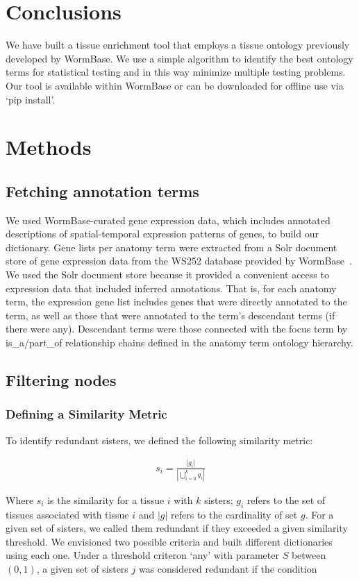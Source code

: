 \section*{Conclusions}

We have built a tissue enrichment tool that employs a tissue ontology previously
developed by WormBase. We use a simple algorithm to identify the best ontology
terms for statistical testing and in this way minimize multiple testing problems.
Our tool is available within WormBase or can be downloaded for offline use via
`pip install'.

\section*{Methods}
\subsection*{Fetching annotation terms}
We used WormBase-curated gene expression data, which includes annotated
descriptions of spatial-temporal expression patterns of genes, to build our
dictionary. Gene lists per anatomy term were extracted from a Solr document
store of gene expression data from the WS252 database provided by
WormBase~\citep{Howe2016}. We used the Solr document store because it provided a
convenient access to expression data that included inferred annotations. That
is, for each anatomy term, the expression gene list includes genes that were
directly annotated to the term, as well as those that were annotated to the
term's descendant terms (if there were any). Descendant terms were those
connected with the focus term by is\_a/part\_of relationship chains defined in
the anatomy term ontology hierarchy.

\subsection*{Filtering nodes}
\subsubsection*{Defining a Similarity Metric}
To identify redundant sisters, we defined the following similarity metric:

\begin{eqnarray}
  \label{similarity def}
	s_i = \frac{|g_i|}{|\bigcup_{i= 0}^k g_i|}
\end{eqnarray}

Where $s_i$ is the similarity for a tissue $i$ with $k$ sisters; $g_i$ refers to
the set of tissues associated with tissue $i$ and $|g|$ refers to the
cardinality of set $g$. For a given set of sisters, we called them redundant if
they exceeded a given similarity threshold. We envisioned two possible criteria
and built different dictionaries using each one. Under a threshold criteron
`any' with parameter $S$ between $(0, 1)$, a given set of sisters $j$ was
considered redundant if the condition

